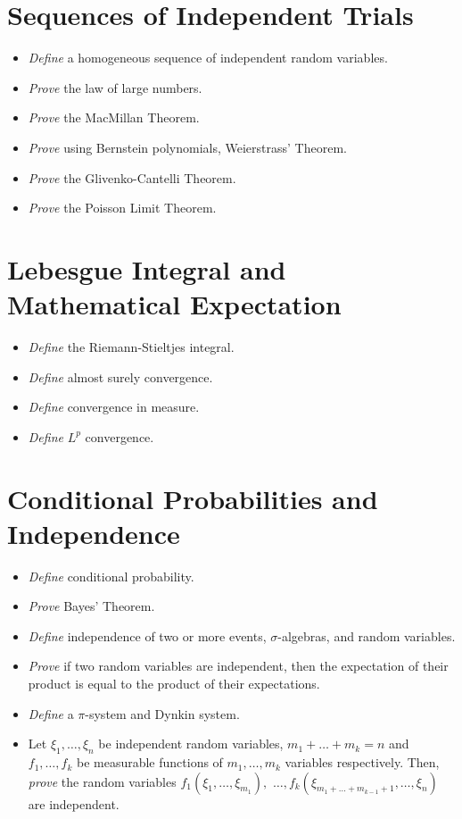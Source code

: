 \documentclass{article}
\newcommand{\cold}{{\color{babyblue}{\Snowflake}}}
\newcommand{\elegant}{{\color{brickred}{\ding{46}}}}
\newcommand{\prac}{{\color{arsenic}{\ding{43}}}}
\newcommand{\know}{{\color{arylideyellow}{\Lightning}}}
\begin{document}
\section{Sequences of Independent Trials}
\begin{itemize}[nosep]
    \item[\cold] \textit{Define} a homogeneous sequence of independent random variables. 
    \item[\cold] \textit{Prove} the law of large numbers.
    \item[\know] \textit{Prove} the MacMillan Theorem.
    \item[\elegant] \textit{Prove} using Bernstein polynomials, Weierstrass' Theorem.
    \item[\prac] \textit{Prove} the Glivenko-Cantelli Theorem.
    \item[\elegant] \textit{Prove} the Poisson Limit Theorem.
\end{itemize}
\section{Lebesgue Integral and Mathematical Expectation}
\begin{itemize}[nosep]
    \item[\cold] \textit{Define} the Riemann-Stieltjes integral.
    \item[\cold] \textit{Define} almost surely convergence. 
    \item[\cold] \textit{Define} convergence in measure. 
    \item[\cold] \textit{Define} $L^p$ convergence.
\end{itemize}

\section{Conditional Probabilities and Independence}
\begin{itemize}[nosep]
    \item[\cold] \textit{Define} conditional probability.
    \item[\cold] \textit{Prove} Bayes' Theorem.
    \item[\cold] \textit{Define} independence of two or more events, $\sigma$-algebras, and random variables. 
    \item[\prac] \textit{Prove} if two random variables are independent, then the expectation of their product is equal to the product of their expectations. 
    \item[\cold] \textit{Define} a $\pi$-system and Dynkin system.
    \item[\prac] Let $\xi_1,\ldots,\xi_n$ be independent random variables, $m_1+\ldots+m_k= n$ and $f_1,\ldots,f_k$ be measurable functions of $m_1,\ldots,m_k$ variables respectively. Then, \textit{prove} the random variables $f_1(\xi_1,\ldots,\xi_{m_1}),$ $\ldots, f_k(\xi_{m_1+\ldots+m_{k-1}+1},\ldots,\xi_n)$ are independent. 
\end{itemize}
\end{document}
